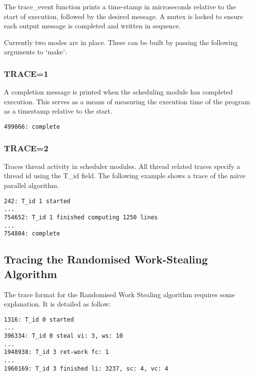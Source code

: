 The trace\_event function prints a time-stamp in microseconds relative to the start of execution,
followed by the desired message. A \gls{mutex} is locked to ensure each output message
is completed and written in sequence.

Currently two modes are in place.
These can be built by passing the following arguments to `make':
\subsubsection*{TRACE=1}
            A completion message is printed when the scheduling module has completed execution.
            This serves as a means of measuring the execution time of the program as a timestamp
            relative to the start.
            
\begin{lstlisting}
499066: complete
\end{lstlisting}


\subsubsection*{TRACE=2}
            Traces thread activity in scheduler modules. 
            All thread related traces specify a thread id using the T\_id field.
            The following example shows a trace of the na\"{\i}ve parallel algorithm.
            
\begin{lstlisting}
242: T_id 1 started
...
754652: T_id 1 finished computing 1250 lines
...
754804: complete
\end{lstlisting}

\subsection*{Tracing the Randomised Work-Stealing Algorithm}

The trace format for the Randomised Work Stealing algorithm requires some explanation.
It is detailed as follow:
\\

\begin{lstlisting}[label = ls:wstraceeg,caption = Examples of the Four Traced Events for the Randomised Work-Stealing Scheme]
1316: T_id 0 started
...
396334: T_id 0 steal vi: 3, ws: 10
...
1948938: T_id 3 ret-work fc: 1
...
1960169: T_id 3 finished li: 3237, sc: 4, vc: 4
\end{lstlisting}

